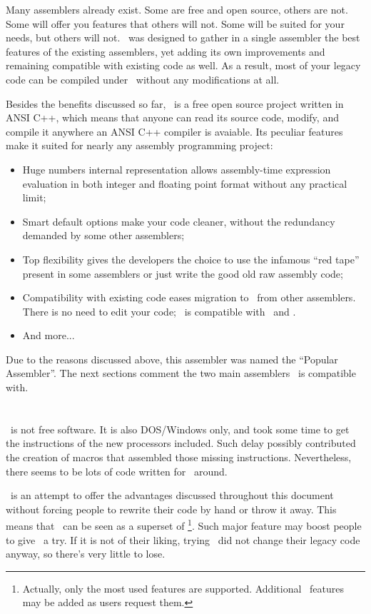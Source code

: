 \documentclass[a4paper,draft,12pt]{book}
\begin{document}
Many assemblers already exist. Some are free and open source, others
are not. Some will offer you features that others
will not. Some will be suited for your needs, but others will not.
\popasm\ was designed to gather in a single
assembler the best features of the existing assemblers, yet adding its
own improvements and remaining compatible with
existing code as well. As a result, most of your legacy code can be
compiled under \popasm\ without any modifications
at all.

Besides the benefits discussed so far, \popasm\ is a free open
source project written in ANSI C++, which means
that anyone can read its source code, modify, and compile it anywhere
an ANSI C++ compiler is avaiable. Its peculiar
features make it suited for nearly any assembly programming project:

\begin{itemize}
   \item{Huge numbers internal representation} allows assembly-time
expression evaluation in both integer and floating
point format without any practical limit;
   \item{Smart default options} make your code cleaner, without the
redundancy demanded by some other assemblers;
   \item{Top flexibility} gives the developers the choice to use the
infamous ``red tape'' present in some assemblers
or just write the good old raw assembly code;
   \item{Compatibility with existing code} eases migration to
\popasm\ from other assemblers. There is no need to edit your code;
\popasm\ is compatible with \tasm\ and \nasm.
   \item{And more...}
\end{itemize}

Due to the reasons discussed above, this assembler was named the
``Popular Assembler''. The next sections comment the two main
assemblers \popasm\ is compatible with.

\section{\tasm}
\tasm\ is not free software. It is also DOS/Windows only, and
took some time to get the instructions of the new processors
included. Such delay possibly contributed the creation of macros
that assembled those missing instructions. Nevertheless, there
seems to be lots of code written for \tasm\ around.

\popasm\ is an attempt to offer the advantages discussed throughout
this document without forcing people to rewrite their code by hand
or throw it away. This means that \popasm\ can be seen as a superset
of \tasm\footnote{Actually, only the most used features are supported.
Additional \tasm\ features may be added as users request them.}.
Such major feature may boost people to give \popasm\ a try. If it
is not of their liking, trying \popasm\ did not change their legacy
code anyway, so there's very little to lose.
\end{document}
